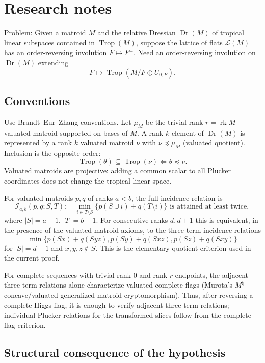 \documentclass[12pt]{article}
\newcommand{\Dr}{\operatorname{Dr}}
\newcommand{\Trop}{\operatorname{Trop}}
\newcommand{\rk}{\operatorname{rk}}
\newcommand{\cL}{\mathcal L}
\begin{document}
\section*{Research notes}

Problem: Given a matroid $M$ and the relative Dressian $\Dr(M)$ of
tropical linear subspaces contained in $\Trop(M)$, suppose the lattice
of flats $\cL(M)$ has an order-reversing involution
$F\mapsto F^\perp$.  Need an order-reversing involution on $\Dr(M)$
extending
\[
F\longmapsto \Trop(M/F\oplus U_{0,F}).
\]

\subsection*{Conventions}

Use Brandt--Eur--Zhang conventions.  Let $\mu_M$ be the trivial rank
$r=\rk M$ valuated matroid supported on bases of $M$.  A rank $k$
element of $\Dr(M)$ is represented by a rank $k$ valuated matroid
$\nu$ with $\nu\preceq\mu_M$ (valuated quotient).  Inclusion is the
opposite order:
\[
\Trop(\theta)\subseteq\Trop(\nu)
\Longleftrightarrow
\theta\preceq\nu.
\]
Valuated matroids are projective: adding a common scalar to all
Plucker coordinates does not change the tropical linear space.

For valuated matroids $p,q$ of ranks $a<b$, the full incidence
relation is
\[
\mathcal I_{a,b}(p,q;S,T):\quad
\min_{i\in T\setminus S}\{p(S\cup i)+q(T\setminus i)\}
\text{ is attained at least twice},
\]
where $|S|=a-1$, $|T|=b+1$.  For consecutive ranks $d,d+1$ this is
equivalent, in the presence of the valuated-matroid axioms, to the
three-term incidence relations
\[
 \min\{p(Sx)+q(Syz),p(Sy)+q(Sxz),p(Sz)+q(Sxy)\}
\]
for $|S|=d-1$ and $x,y,z\notin S$.  This is the elementary quotient
criterion used in the current proof.

For complete sequences with trivial rank $0$ and rank $r$ endpoints,
the adjacent three-term relations alone characterize valuated complete
flags (Murota's $M^\natural$-concave/valuated generalized matroid
cryptomorphism).  Thus, after reversing a complete Higgs flag, it is
enough to verify adjacent three-term relations; individual Plucker
relations for the transformed slices follow from the complete-flag
criterion.


\subsection*{Structural consequence of the hypothesis}
\end{document}
